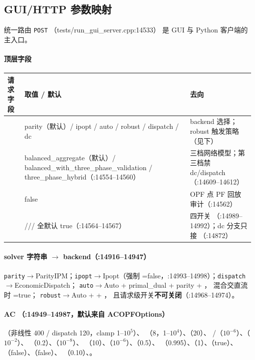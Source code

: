 \subsection{GUI/HTTP 参数映射}
统一路由 \texttt{POST} （tests/run\_gui\_server.cpp:14533）
是 GUI 与 Python 客户端的主入口。

\paragraph{顶层字段}
\begin{center}
\footnotesize
\begin{tabular}{@{}L{3.4cm}L{5.6cm}L{5.4cm}@{}}
\toprule
请求字段 & 取值 / 默认 & 去向\\
\midrule
{} & parity（默认）/ ipopt / auto / robust / dispatch / dc &
  backend 选择；robust 触发策略（见下）\\
 & balanced\_aggregate（默认）/ balanced\_with\_three\_phase\_validation
  / three\_phase\_hybrid（:14554--14560） & 三档网络模型；第三档禁 dc/dispatch（:14609--14612）\\
 & false & OPF 点 PF 回放审计（:14562）\\
 & ///
   全默认 true（:14564--14567） &  四开关
  （:14989--14992）；dc 分支只接 （:14872）\\
\bottomrule
\end{tabular}
\end{center}

\paragraph{solver 字符串 $\to$ backend（:14916--14947）}
\texttt{parity}$\to$ParityIPM；\texttt{ipopt}$\to$Ipopt（强制
=false，:14993--14998）；\texttt{dispatch}$\to$EconomicDispatch；
\texttt{auto}$\to$Auto + primal\_dual + parity + ，
混合交直流时 =true；
\texttt{robust}$\to$Auto +  + ，
且请求级开关\textbf{不可关闭}（:14968--14974）。

\paragraph{AC （:14949--14987，默认来自 ACOPFOptions）}
（非线性 400 / dispatch 120，clamp 1--$10^5$）、
（8，1--$10^4$）、（20）、
/（$10^{-6}$）、（$10^{-2}$）、
（0.2）、（$10^{-8}$）、
（10）、（$10^{-6}$）、（0.5）、
（0.995）、（1）、（true）、
（false）、（false）、
（0.10）、。

